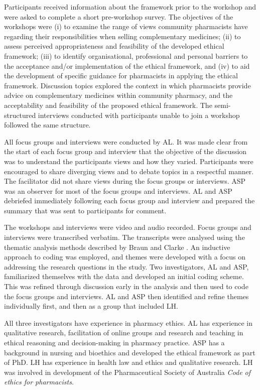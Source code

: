 \documentclass[11pt,a4paper]{article}
\begin{document}
Participants received information about the framework prior to the
workshop and were asked to complete a short pre-workshop survey. The
objectives of the workshops were (i) to examine the range of views
community pharmacists have regarding their responsibilities when selling
complementary medicines; (ii) to assess perceived appropriateness and
feasibility of the developed ethical framework; (iii) to identify
organisational, professional and personal barriers to the acceptance
and/or implementation of the ethical framework, and (iv) to aid the
development of specific guidance for pharmacists in applying the ethical
framework. Discussion topics explored the context in which pharmacists
provide advice on complementary medicines within community pharmacy, and
the acceptability and feasibility of the proposed ethical framework. The
semi-structured interviews conducted with participants unable to join a
workshop followed the same structure.

All focus groups and interviews were conducted by AL. It was made clear
from the start of each focus group and interview that the objective of
the discussion was to understand the participants views and how they
varied. Participants were encouraged to share diverging views and to
debate topics in a respectful manner. The facilitator did not share
views during the focus groups or interviews. ASP was an observer for
most of the focus groups and interviews. AL and ASP debriefed
immediately following each focus group and interview and prepared the
summary that was sent to participants for comment.

The workshops and interviews were video and audio recorded. Focus groups
and interviews were transcribed verbatim. The transcripts were analysed
using the thematic analysis methods described by Braun and Clarke
\autocite*{Braun2016}. An inductive approach to coding was employed, and
themes were developed with a focus on addressing the research questions
in the study. Two investigators, AL and ASP, familiarized themselves
with the data and developed an initial coding scheme. This was refined
through discussion early in the analysis and then used to code the focus
groups and interviews. AL and ASP then identified and refine themes
individually first, and then as a group that included LH.

All three investigators have experience in pharmacy ethics. AL has
experience in qualitative research, facilitation of online groups and
research and teaching in ethical reasoning and decision-making in
pharmacy practice. ASP has a background in nursing and bioethics and
developed the ethical framework as part of PhD. LH has experience in
health law and ethics and qualitative research. LH was involved in
development of the Pharmaceutical Society of Australia \emph{Code of
ethics for pharmacists}.
\end{document}
